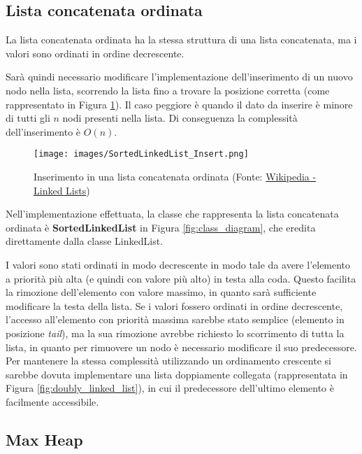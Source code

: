 \documentclass{article}
\begin{document}
\subsection{Lista concatenata ordinata}

La lista concatenata ordinata ha la stessa struttura di una lista concatenata, ma i valori sono ordinati in ordine decrescente.

Sarà quindi necessario modificare l'implementazione dell'inserimento di un nuovo nodo nella lista, scorrendo la lista fino a trovare la posizione corretta (come rappresentato in Figura \ref{fig:sorted_linked_list_insert}).
Il caso peggiore è quando il dato da inserire è minore di tutti gli $n$ nodi presenti nella lista. Di conseguenza la complessità dell'inserimento è $O(n)$.

\begin{figure}[h]
    \texttt{[image: images/SortedLinkedList\_Insert.png]}
    \centering
    \caption{Inserimento in una lista concatenata ordinata (Fonte: \href{https://en.wikipedia.org/wiki/Linked_list}{Wikipedia - Linked Lists})}
    \label{fig:sorted_linked_list_insert}
\end{figure}

Nell'implementazione effettuata, la classe che rappresenta la lista concatenata ordinata è \textbf{SortedLinkedList} in Figura \ref{fig:class_diagram}, che eredita direttamente dalla classe LinkedList.

\vspace{5pt}
I valori sono stati ordinati in modo decrescente in modo tale da avere l'elemento a priorità più alta (e quindi con valore più alto) in testa alla coda. Questo facilita la rimozione dell'elemento con valore massimo, in quanto sarà sufficiente modificare la testa della lista. Se i valori fossero ordinati in ordine decrescente, l'accesso all'elemento con priorità massima sarebbe stato semplice (elemento in posizione \emph{tail}), ma la sua rimozione avrebbe richiesto lo scorrimento di tutta la lista, in quanto per rimuovere un nodo è necessario modificare il suo predecessore. Per mantenere la stessa complessità utilizzando un ordinamento crescente si sarebbe dovuta implementare una lista doppiamente collegata (rappresentata in Figura \ref{fig:doubly_linked_list}), in cui il predecessore dell'ultimo elemento è facilmente accessibile.

\clearpage
\subsection{Max Heap}
\end{document}
